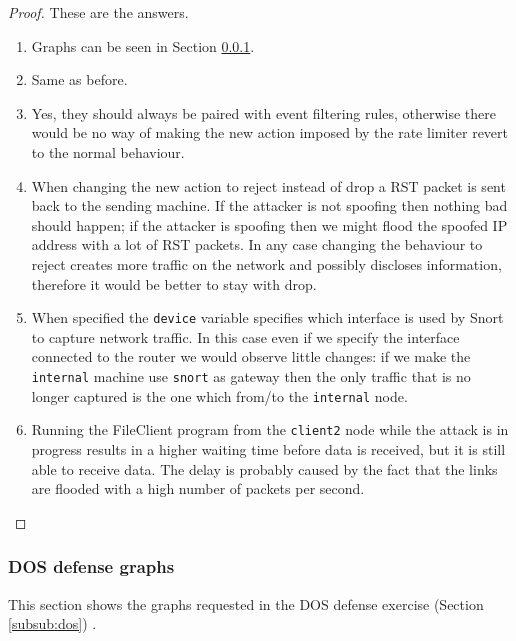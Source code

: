 \documentclass[a4paper,11pt,hidelinks]{article}
\begin{document}
\begin{proof}
    These are the answers.
    \begin{enumerate}
        \item Graphs can be seen in Section \ref{subsub:graphs}.
        \item Same as before.
        \item Yes, they should always be paired with event filtering rules, otherwise there would be no way of making the new action imposed by the rate limiter revert to the normal behaviour.
        \item When changing the new action to reject instead of drop a RST packet is sent back to the sending machine. If the attacker is not spoofing then nothing bad should happen; if the attacker is spoofing then we might flood the spoofed IP address with a lot of RST packets. In any case changing the behaviour to reject creates more traffic on the network and possibly discloses information, therefore it would be better to stay with drop.
        \item When specified the \texttt{device} variable specifies which interface is used by Snort to capture network traffic. In this case even if we specify the interface connected to the router we would observe little changes: if we make the \texttt{internal} machine use \texttt{snort} as gateway then the only traffic that is no longer captured is the one which from/to the \texttt{internal} node.
        \item Running the FileClient program from the \texttt{client2} node while the attack is in progress results in a higher waiting time before data is received, but it is still able to receive data. The delay is probably caused by the fact that the links are flooded with a high number of packets per second.
    \end{enumerate}
\end{proof}

\subsubsection{DOS defense graphs}
\label{subsub:graphs}

This section shows the graphs requested in the DOS defense exercise (Section \ref{subsub:dos}) .
    
\end{document}

